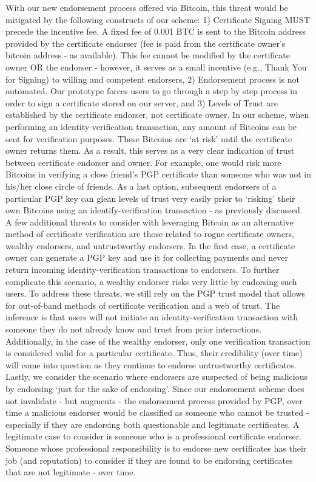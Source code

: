 \documentclass{llncs}
\begin{document}
\indent With our new endorsement process offered via Bitcoin, this threat would be mitigated by the following constructs of our scheme:  1) Certificate Signing MUST precede the incentive fee. A fixed fee of 0.001 BTC is sent to the Bitcoin address provided by the certificate endorser (fee is paid from the certificate owner's bitcoin address - as available).  This fee cannot be modified by the certificate owner OR the endorser - however, it serves as a small incentive (e.g., Thank You for Signing) to willing and competent endorsers, 2) Endorsement process is not automated. Our prototype forces users to go through a step by step process in order to sign a certificate stored on our server, and 3) Levels of Trust are established by the certificate endorser, not certificate owner. In our scheme, when performing an identity-verification transaction, any amount of Bitcoins can be sent for verification purposes.  These Bitcoins are `at risk' until the certificate owner returns them.  As a result, this serves as a very clear indication of trust between certificate endorser and owner.  For example, one would risk more Bitcoins in verifying a close friend's PGP certificate than someone who was not in his/her close circle of friends.  As a last option, subsequent endorsers of a particular PGP key can glean levels of trust very easily prior to `risking' their own Bitcoins using an identify-verification transaction - as previously discussed.\\ 
\indent A few additional threats to consider with leveraging Bitcoin as an alternative method of certificate verification are those related to rogue certificate owners, wealthy endorsers, and untrustworthy endorsers.  In the first case, a certificate owner can generate a PGP key and use it for collecting payments and never return incoming identity-verification transactions to endorsers.  To further complicate this scenario, a wealthy endorser risks very little by endorsing such users.  To address these threats, we still rely on the PGP trust model that allows for out-of-band methods of certificate verification and a web of trust.  The inference is that users will not initiate an identity-verification transaction with someone they do not already know and trust from prior interactions.  Additionally, in the case of the wealthy endorser, only one verification transaction is considered valid for a particular certificate.  Thus, their credibility (over time) will come into question as they continue to endorse untrustworthy certificates.  Lastly, we consider the scenario where endorsers are suspected of being malicious by endorsing `just for the sake of endorsing'.  Since our endorsement scheme does not invalidate - but augments - the endorsement process provided by PGP, over time a malicious endorser would be classified as someone who cannot be trusted - especially if they are endorsing both questionable and legitimate certificates.  A legitimate case to consider is someone who is a professional certificate endorser.  Someone whose professional responsibility is to endorse new certificates has their job (and reputation) to consider if they are found to be endorsing certificates that are not legitimate - over time.     
\end{document}
